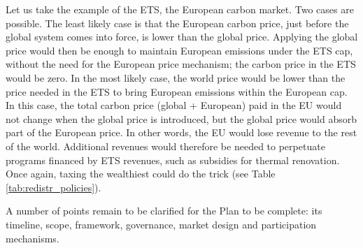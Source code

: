\documentclass[a5paper,english,openany]{memoir}
\begin{document}
Let us %
take the example of the ETS, the European carbon market. Two cases are possible. The least likely case is that the European carbon price, just before the global system comes into force, %
is lower than the global price. Applying the global price would then be enough to maintain European emissions under the ETS cap, without the need for the European price mechanism; %
the carbon price in the ETS would be zero. In the most likely case, the world price would be lower than the price needed in the ETS to bring European emissions within the European cap. In this case, the total carbon price (global + European) paid in the EU would not change when the global price is introduced, but the global price would absorb part of the European price. In other words, the EU would lose revenue to the rest of the world. Additional revenues would therefore be needed to perpetuate programs financed by ETS revenues, such as subsidies for thermal renovation. Once again, taxing the wealthiest could do the trick (see Table \ref{tab:redistr_policies}).





A number of points remain to be clarified for the Plan to be complete: its timeline, %
scope, framework, governance, market design and participation mechanisms. 
\end{document}

